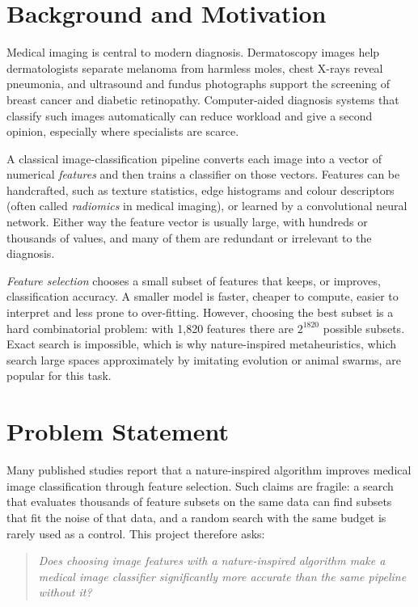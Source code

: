 \documentclass[12pt,a4paper]{report}
\begin{document}
\section{Background and Motivation}
Medical imaging is central to modern diagnosis. Dermatoscopy images help dermatologists separate melanoma from
harmless moles, chest X-rays reveal pneumonia, and ultrasound and fundus photographs support the screening of breast
cancer and diabetic retinopathy. Computer-aided diagnosis systems that classify such images automatically can
reduce workload and give a second opinion, especially where specialists are scarce.

A classical image-classification pipeline converts each image into a vector of numerical \emph{features} and then
trains a classifier on those vectors. Features can be handcrafted, such as texture statistics, edge histograms and
colour descriptors (often called \emph{radiomics} in medical imaging), or learned by a convolutional neural
network. Either way the feature vector is usually large, with hundreds or thousands of values, and many of them are
redundant or irrelevant to the diagnosis.

\emph{Feature selection} chooses a small subset of features that keeps, or improves, classification accuracy. A
smaller model is faster, cheaper to compute, easier to interpret and less prone to over-fitting. However, choosing
the best subset is a hard combinatorial problem: with 1,820 features there are $2^{1820}$ possible subsets. Exact
search is impossible, which is why nature-inspired metaheuristics, which search large spaces approximately by
imitating evolution or animal swarms, are popular for this task.

\section{Problem Statement}
Many published studies report that a nature-inspired algorithm improves medical image classification through
feature selection. Such claims are fragile: a search that evaluates thousands of feature subsets on the same data
can find subsets that fit the noise of that data, and a random search with the same budget is rarely used as a
control. This project therefore asks:

\begin{quote}
\emph{Does choosing image features with a nature-inspired algorithm make a medical image classifier significantly
more accurate than the same pipeline without it?}
\end{quote}
\end{document}
